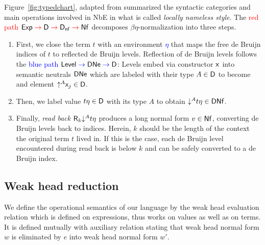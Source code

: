\documentclass[acmlarge,review,anonymous]{acmart}\settopmatter{printfolios=true}
\begin{document}
\newcommand{\redto}{\mathrel{\color{red}{\to}}}
\newcommand{\blueto}{\mathrel{\color{blue}{\to}}}

Figure~\ref{fig:typedchart}, adapted from \citet{abel:habil} summarized the syntactic categories and main operations involved in NbE in what is called \emph{locally nameless style}.  The \textcolor{red}{red path} $\Exp \redto \D \redto \Dnf \redto \Nf$ decomposes $\beta\eta$-normalization into three steps.
\begin{enumerate}
\item
First, we close the term $t$ with an environment \textcolor{blue}{$\eta$} that maps the
free de Bruijn indices of $t$ to reflected de Bruijn levels.
Reflection of de Bruijn levels follows the \textcolor{blue}{blue path}
$\Level \blueto \DNe \blueto \D$: Levels embed via constructor $\mathsf{x}_{}$
into semantic neutrals $\mathsf{DNe}$ which are labeled with their type $A \in \mathsf{D}$ to become and element $\mathord{\uparrow^{A}} \mathsf{x}_{j} \in \mathsf{D}$.

\item
Then, we label value $t \eta \in \mathsf{D}$ with its type $A$ to obtain $\mathord{\downarrow^{A}} t \eta \in \mathsf{DNf}$.
\item
Finally, \emph{read back} %
$\mathsf{R}_k \mathord{\downarrow^{A}} t\eta$ produces a long normal form $v \in \mathsf{Nf}$, converting de Bruijn levels back to indices.
Herein, $k$ should be the length of the context the original term $t$ lived in.
If this is the case, each de Bruijn level encountered during read back is below $k$ and can be safely converted to a de Bruijn index.
\end{enumerate}

\subsection{Weak head reduction}

We define the operational semantics of our language by the weak head
evaluation relation  which is defined on
expressions, thus works on values as well as on terms.  It is defined mutually
with auxiliary relation  stating that weak
head normal form $w$ is eliminated by $e$ into weak head normal form $w'$.
\end{document}
